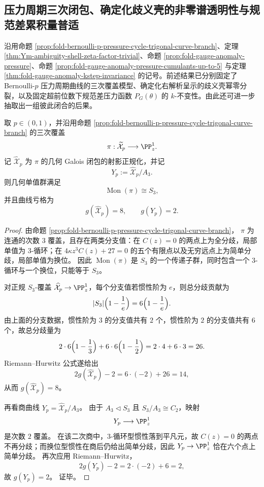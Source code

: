 \subsection{压力周期三次闭包、确定化歧义壳的非零谱透明性与规范差累积量普适}\label{subsec:conclusion-pressure-curve-s3-jordan-cumulant-universality}
沿用命题 \ref{prop:fold-bernoulli-p-pressure-cycle-trigonal-curve-branch}、定理 \ref{thm:Ym-ambiguity-shell-zeta-factor-trivial}、命题 \ref{prop:fold-gauge-anomaly-pressure}、命题 \ref{prop:fold-gauge-anomaly-pressure-cumulants-up-to-5} 与定理 \ref{thm:fold-gauge-anomaly-kstep-invariance} 的记号。前述结果已分别固定了 Bernoulli-\(p\) 压力周期曲线的三次覆盖模型、确定化右解析呈示的歧义壳幂零分裂，以及固定超前位数下规范差压力函数 \(P_G(\theta)\) 的 \(k\)-不变性。由此还可进一步抽取出一组彼此闭合的后果。

\begin{theorem}\label{thm:conclusion-pressure-cycle-s3-galois-closure-genus8}
取 \(p\in(0,1)\)，并沿用命题 \ref{prop:fold-bernoulli-p-pressure-cycle-trigonal-curve-branch} 的三次覆盖
\[
\pi:\widetilde{\mathcal X}_p\longrightarrow \PP^1_z.
\]
记 \(\widehat{\mathcal X}_p\) 为 \(\pi\) 的几何 Galois 闭包的射影正规化，并记
\[
Y_p:=\widehat{\mathcal X}_p/A_3.
\]
则几何单值群满足
\[
\operatorname{Mon}(\pi)\cong S_3,
\]
并且曲线亏格为
\[
g(\widehat{\mathcal X}_p)=8,
\qquad
g(Y_p)=2.
\]
\end{theorem}
\begin{proof}
由命题 \ref{prop:fold-bernoulli-p-pressure-cycle-trigonal-curve-branch}，
\(\pi\) 为连通的次数 \(3\) 覆盖，且存在两类分支值：在 \(C(z)=0\) 的两点上为全分歧，局部单值为 \(3\)-循环；在
\(
4\kappa z^3 C(z)+27=0
\)
的五个有限点以及无穷远点上为简单分歧，局部单值为换位。
因此 \(\operatorname{Mon}(\pi)\) 是 \(S_3\) 的一个传递子群，同时包含一个 \(3\)-循环与一个换位，只能等于 \(S_3\)。

对正规 \(S_3\)-覆盖 \(\widehat{\mathcal X}_p\to\PP^1_z\)，每个分支值若惯性阶为 \(e\)，则总分歧贡献为
\[
|S_3|\Bigl(1-\frac{1}{e}\Bigr)=6\Bigl(1-\frac{1}{e}\Bigr).
\]
由上面的分支数据，惯性阶为 \(3\) 的分支值共有 \(2\) 个，惯性阶为 \(2\) 的分支值共有 \(6\) 个，故总分歧量为
\[
2\cdot 6\Bigl(1-\frac13\Bigr)+6\cdot 6\Bigl(1-\frac12\Bigr)
=
2\cdot 4+6\cdot 3
=26.
\]
Riemann--Hurwitz 公式遂给出
\[
2g(\widehat{\mathcal X}_p)-2
=
6\cdot(-2)+26
=14,
\]
从而 \(g(\widehat{\mathcal X}_p)=8\)。

再看商曲线 \(Y_p=\widehat{\mathcal X}_p/A_3\)。
由于 \(A_3\triangleleft S_3\) 且 \(S_3/A_3\cong C_2\)，映射
\[
Y_p\longrightarrow \PP^1_z
\]
是次数 \(2\) 覆盖。
在该二次商中，\(3\)-循环型惯性落到平凡元，故 \(C(z)=0\) 的两点不再分歧；而换位型惯性在商后仍给出简单分歧，因此 \(Y_p\to\PP^1_z\) 恰在六个点上简单分歧。
再次应用 Riemann--Hurwitz，
\[
2g(Y_p)-2
=
2\cdot(-2)+6
=2,
\]
故 \(g(Y_p)=2\)。
证毕。
\end{proof}

